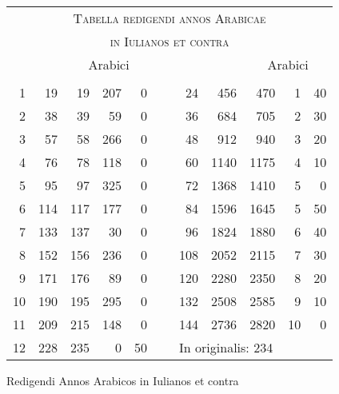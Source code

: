 %
\begin{tabnums} %
\normalsize
\centering
\setlength{\tabcolsep}{1.0ex}
%
\newcommand{\cwd}{3.2em}
\newcommand{\da}{{\tiny †}}
\newcommand{\db}{{\scriptsize ‡}}
\newcommand{\ang}{90}
\newcommand{\hsa}[1]{\scriptsize{#1}}
\newcommand{\hsb}[1]{\tiny{#1}}
\newcommand{\hdrA}{%
  ~ & ~ & \multicolumn{3}{c}{\hsa{Arabici}}
}
%
\newcommand{\hdrB}{%
  \hsb{\ch{Ennedecam}{Enneadeca\-e\-te\-ri\-des}} &
  \ch{8888}{\hsb{Anni Iuliani}}&
  \ch{8888}{\hsb{Anni Arabici}} &
  \hsb{\ch{Dies}{Dies}} &
  \hsb{\ch{Scrupux}{Scrupu\-li~diei}} 
}
%
\newcommand{\hdrs}{%
 \hdrA & & \hdrA \\
 \cmidrule(lr){3-5} \cmidrule(l){9-11}
 \hdrB & & \hdrB \\
 \cmidrule{1-5} \cmidrule{7-11}
}
%
\begin{tabular}[c]{@{} rrrrr c rrrrr @{}}
\toprule
\multicolumn{11}{c}{\Large\textsc{Tabella redigendi annos Arabicae}} \\
\multicolumn{11}{c}{\large\textsc{in Iulianos et contra}} \\
\toprule
\hdrs %
  1 &  19 &  19 & 207 &  0 &~&  24\super\da &  456 &  470 &  1 & 40\\
  2 &  38 &  39 &  59 &  0 &~&  36 &  684 &  705 &  2 & 30\\
  3 &  57 &  58 & 266 &  0 &~&  48 &  912 &  940 &  3 & 20\\
  4 &  76 &  78 & 118 &  0 &~&  60 & 1140 & 1175 &  4 & 10\\
  5 &  95 &  97 & 325 &  0 &~&  72 & 1368 & 1410 &  5 &  0\\
  6 & 114 & 117 & 177 &  0 &~&  84 & 1596 & 1645 &  5 & 50\\
  7 & 133 & 137 &  30 &  0 &~&  96 & 1824 & 1880 &  6 & 40\\
  8 & 152 & 156 & 236 &  0 &~& 108 & 2052 & 2115 &  7 & 30\\
  9 & 171 & 176 &  89 &  0 &~& 120 & 2280 & 2350 &  8 & 20\\
 10 & 190 & 195 & 295 &  0 &~& 132 & 2508 & 2585 &  9 & 10\\
 11 & 209 & 215 & 148 &  0 &~& 144 & 2736 & 2820 & 10 &  0\\
 12 & 228 & 235 &   0 & 50 &~&     
  \multicolumn{4}{l}{\super\da\scriptsize In originalis: 234}  \\
\bottomrule
\end{tabular}
\caption{Redigendi Annos Arabicos in Iulianos et contra}
\label{tab:p141a}
\end{tabnums}
